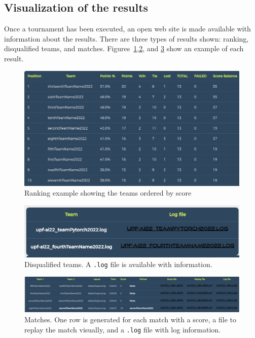 \documentclass[11pt]{article}
\begin{document}

\subsection{Visualization of the results}
Once a tournament has been executed, an open web site is made available with information about the results. There are three types of results shown: ranking, disqualified teams, and matches.
Figures~\ref{fig:t1},\ref{fig:t2}, and \ref{fig:t3} show an example of each result.

\begin{figure}[b!]
    \center 
    \includegraphics[width=.9\textwidth]{ranking.png} 
    \caption{Ranking example showing the teams ordered by score}\label{fig:t1}
\end{figure}
\begin{figure}[b!]
    \center 
    \includegraphics[width=.7\textwidth]{disq.png} 
    \caption{Disqualified teams. A \texttt{.log} file is available with information.}\label{fig:t2}
\end{figure}
\begin{figure}[b!]
    \center 
    \includegraphics[width=\textwidth]{matches.png} 
    \caption{Matches. One row is generated for each match with a score, a file to replay the match visually, and a \texttt{.log} file with log information.}\label{fig:t3}
\end{figure}
\end{document}
